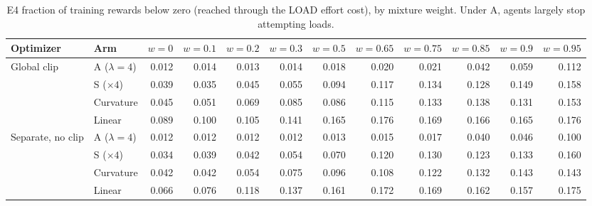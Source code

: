 \begin{table}[H]
\caption{E4 fraction of training rewards below zero (reached through the LOAD effort cost), by mixture weight. Under A, agents largely stop attempting loads.}
\label{tab:lbf_occupancy}
\centering\scriptsize
\begin{tabular}{@{}llrrrrrrrrrr@{}}
\toprule
Optimizer & Arm & $w{=}0$ & $w{=}0.1$ & $w{=}0.2$ & $w{=}0.3$ & $w{=}0.5$ & $w{=}0.65$ & $w{=}0.75$ & $w{=}0.85$ & $w{=}0.9$ & $w{=}0.95$ \\
\midrule
Global clip & A ($\lambda{=}4$) & 0.012 & 0.014 & 0.013 & 0.014 & 0.018 & 0.020 & 0.021 & 0.042 & 0.059 & 0.112 \\
 & S ($\times4$) & 0.039 & 0.035 & 0.045 & 0.055 & 0.094 & 0.117 & 0.134 & 0.128 & 0.149 & 0.158 \\
 & Curvature & 0.045 & 0.051 & 0.069 & 0.085 & 0.086 & 0.115 & 0.133 & 0.138 & 0.131 & 0.153 \\
 & Linear & 0.089 & 0.100 & 0.105 & 0.141 & 0.165 & 0.176 & 0.169 & 0.166 & 0.165 & 0.176 \\
Separate, no clip & A ($\lambda{=}4$) & 0.012 & 0.012 & 0.012 & 0.012 & 0.013 & 0.015 & 0.017 & 0.040 & 0.046 & 0.100 \\
 & S ($\times4$) & 0.034 & 0.039 & 0.042 & 0.054 & 0.070 & 0.120 & 0.130 & 0.123 & 0.133 & 0.160 \\
 & Curvature & 0.042 & 0.042 & 0.054 & 0.075 & 0.096 & 0.108 & 0.122 & 0.132 & 0.143 & 0.143 \\
 & Linear & 0.066 & 0.076 & 0.118 & 0.137 & 0.161 & 0.172 & 0.169 & 0.162 & 0.157 & 0.175 \\
\bottomrule
\end{tabular}
\end{table}
